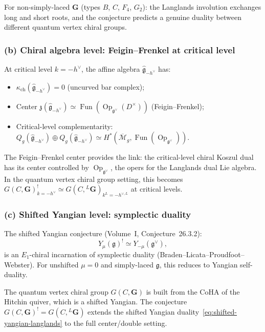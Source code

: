 \documentclass[11pt]{article}
\theoremstyle{definition}
\theoremstyle{remark}
\DeclareMathOperator{\Op}{Op}
\DeclareMathOperator{\Fun}{Fun}
\newcommand{\fkg}{\mathfrak{g}}
\newcommand{\cM}{\mathcal{M}}
\begin{document}
For non-simply-laced $\mathbf{G}$ (types $B$, $C$, $F_4$, $G_2$):
the Langlands involution exchanges long and short roots, and the
conjecture predicts a genuine duality between different quantum vertex
chiral groups.

\subsubsection{(b) Chiral algebra level: Feigin--Frenkel at critical level}

At critical level $k = -h^\vee$, the affine algebra
$\widehat{\fkg}_{-h^\vee}$ has:
\begin{itemize}
\item $\kappa_{\mathrm{ch}}(\widehat{\fkg}_{-h^\vee}) = 0$ (uncurved bar complex);
\item Center $\mathfrak{z}(\widehat{\fkg}_{-h^\vee}) \simeq
\Fun(\Op_{\fkg^\vee}(D^\times))$ (Feigin--Frenkel);
\item Critical-level complementarity:
$Q_g(\widehat{\fkg}_{-h^\vee}) \oplus Q_g(\widehat{\fkg}_{-h^\vee})
\simeq H^*(\overline{\cM}_g, \Fun(\Op_{\fkg^\vee}))$.
\end{itemize}

The Feigin--Frenkel center provides the link: the critical-level
chiral Koszul dual has its center controlled by
$\Op_{\fkg^\vee}$, the opers for the Langlands dual Lie algebra.
In the quantum vertex chiral group setting, this becomes
$G(C, \mathbf{G})_{k=-h^\vee}^! \simeq G(C, {}^L\mathbf{G})_{k^L = -h^{\vee,L}}$
at critical levels.

\subsubsection{(c) Shifted Yangian level: symplectic duality}

The shifted Yangian conjecture (Volume~I, Conjecture~26.3.2):
\begin{equation}\label{eq:shifted-yangian-langlands}
Y_\mu(\fkg)^! \simeq Y_{-\mu}(\fkg^\vee),
\end{equation}
is an $E_1$-chiral incarnation of symplectic duality
(Braden--Licata--Proudfoot--Webster). For unshifted $\mu = 0$ and
simply-laced $\fkg$, this reduces to Yangian self-duality.

The quantum vertex chiral group $G(C, \mathbf{G})$ is built from the
CoHA of the Hitchin quiver, which is a shifted Yangian. The conjecture
$G(C, \mathbf{G})^! = G(C, {}^L\mathbf{G})$ extends the shifted
Yangian duality~\eqref{eq:shifted-yangian-langlands} to the full
center/double setting.
\end{document}
